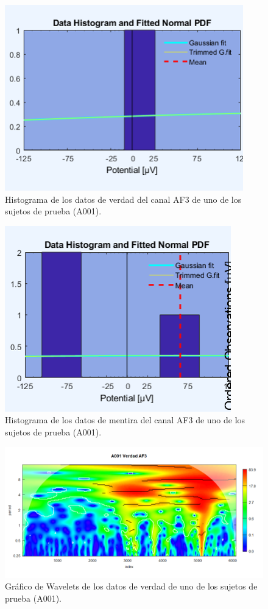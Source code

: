 \begin{figure}
    \centering
    \includegraphics[scale=1]{figuras/Imagen7.png}
    \caption{Histograma de los datos de verdad del canal AF3 de uno de los sujetos de prueba (A001).}
    \label{fig:my_label}
\end{figure}
\begin{figure}
    \centering
    \includegraphics[scale=1]{figuras/Imagen8.png}
    \caption{Histograma de los datos de mentira del canal AF3 de uno de los sujetos de prueba (A001).}
    \label{fig:my_label}
\end{figure}
\begin{figure}
    \centering
    \includegraphics[scale=1]{figuras/Imagen9.png}
    \caption{Gráfico de Wavelets de los datos de verdad de uno de los sujetos de prueba (A001).}
    \label{fig:my_label}
\end{figure}
